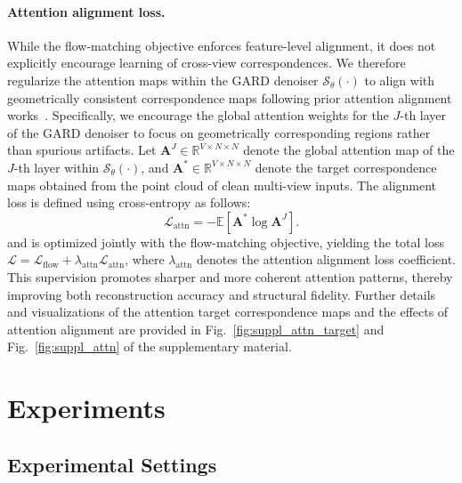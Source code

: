 \documentclass{llmxive}
\begin{document}
\paragraph{Attention alignment loss.}
While the flow-matching objective enforces feature-level alignment, it does not explicitly encourage learning of cross-view correspondences. We therefore regularize the attention maps within the GARD denoiser $\mathcal{S}_{\theta}(\cdot)$ to align with geometrically consistent correspondence maps following prior attention alignment works~\cite{kwon2025cameo, nam2025emergenttemporalcorrespondencesvideo, jin2025matrixmasktrackalignment}. Specifically, we encourage the global attention weights for the $J$-th layer of the GARD denoiser to focus on geometrically corresponding regions rather than spurious artifacts. Let $\mathbf{A}^J \in \mathbb{R}^{V \times N \times N}$ denote the global attention map of the $J$-th layer within $\mathcal{S}_{\theta}(\cdot)$, and $\mathbf{A}^* \in \mathbb{R}^{V \times N \times N}$ denote the target correspondence maps obtained from the point cloud of clean multi-view inputs. The alignment loss is defined using cross-entropy as follows:
\begin{equation}
\mathcal{L}_{\text{attn}} = - \mathbb{E} \left[ \mathbf{A}^{*} \log \mathbf{A}^{J} \right].
\end{equation}
and is optimized jointly with the flow-matching objective, yielding the total loss $\mathcal{L} = \mathcal{L}_{\text{flow}} + \lambda_{\text{attn}} \mathcal{L}_{\text{attn}}$, where $\lambda_\text{attn}$ denotes the attention alignment loss coefficient. This supervision promotes sharper and more coherent attention patterns, thereby improving both reconstruction accuracy and structural fidelity. Further details and visualizations of the attention target correspondence maps and the effects of attention alignment are provided in Fig.~\ref{fig:suppl_attn_target} and Fig.~\ref{fig:suppl_attn} of the supplementary material.


\section{Experiments}
\label{sec:exp}

\subsection{Experimental Settings}
\label{sec:exp_setup}
\end{document}
